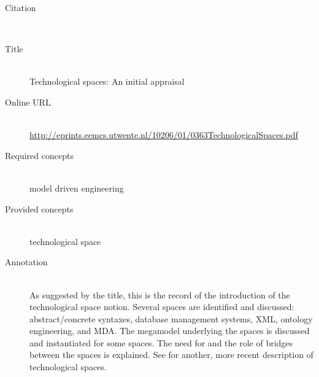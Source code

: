 \begin{description}
\item[Citation]\mbox{}\\
\cite{KurtevBA02}
\item[Title]\mbox{}\\
Technological spaces: An initial appraisal
\item[Online URL]\mbox{}\\
{\footnotesize\url{http://eprints.eemcs.utwente.nl/10206/01/0363TechnologicalSpaces.pdf}}
\item[Required concepts]\mbox{}\\
model driven engineering\item[Provided concepts]\mbox{}\\
technological space\item[Annotation]\mbox{}\\
As suggested by the title, this is the record of the introduction of the technological space notion. Several spaces are identified and discussed: abstract/concrete syntaxes, database management systems, XML, ontology engineering, and MDA. The megamodel underlying the spaces is discussed and instantiated for some spaces. The need for and the role of bridges between the spaces is explained. See \cite{Bezivin06} for another, more recent description of technological spaces.
\end{description}

